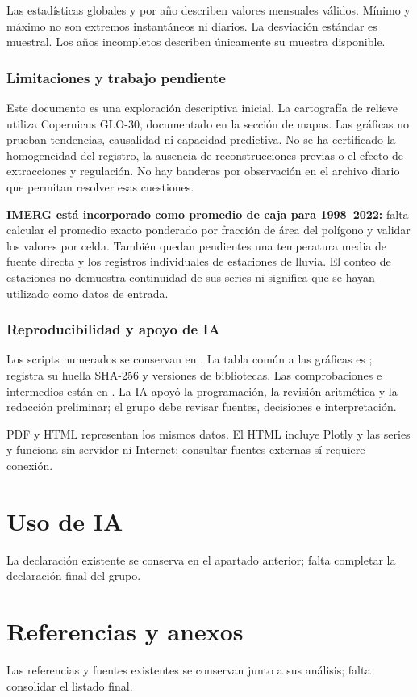 \documentclass[10pt,a4paper]{article}
\begin{document}
Las estadísticas globales y por año describen valores mensuales válidos. Mínimo
y máximo no son extremos instantáneos ni diarios. La desviación estándar es
muestral. Los años incompletos describen únicamente su muestra disponible.

\subsubsection*{Limitaciones y trabajo pendiente}
Este documento es una exploración descriptiva inicial. La cartografía de relieve utiliza Copernicus GLO-30, documentado en la sección de mapas. Las gráficas no prueban
tendencias, causalidad ni capacidad predictiva. No se ha certificado la
homogeneidad del registro, la ausencia de reconstrucciones previas o el efecto de
extracciones y regulación. No hay banderas por observación en el archivo diario
que permitan resolver esas cuestiones.

\textbf{IMERG está incorporado como promedio de caja para 1998--2022:} falta
calcular el promedio exacto ponderado por fracción de área del polígono y validar
los valores por celda. También quedan pendientes una temperatura media de fuente
directa y los registros individuales de estaciones de lluvia. El conteo de estaciones
no demuestra continuidad de sus series ni significa que se hayan utilizado como datos de entrada.

\subsubsection*{Reproducibilidad y apoyo de IA}
Los scripts numerados se conservan en .
La tabla común a las gráficas es ;
 registra su huella SHA-256 y versiones de bibliotecas.
Las comprobaciones e intermedios están en .
La IA apoyó la programación, la revisión aritmética y la redacción preliminar;
el grupo debe revisar fuentes, decisiones e interpretación.

PDF y HTML representan los mismos datos. El HTML incluye Plotly y las series y
funciona sin servidor ni Internet; consultar fuentes externas sí requiere conexión.

\section*{Uso de IA}
La declaración existente se conserva en el apartado anterior; falta completar la declaración final del grupo.
\section*{Referencias y anexos}
Las referencias y fuentes existentes se conservan junto a sus análisis; falta consolidar el listado final.
\end{document}
